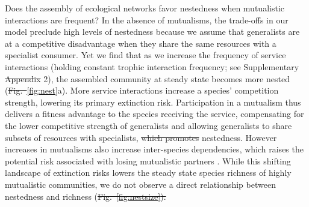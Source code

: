\documentclass[twocolumn,preprintnumbers,amsmath,amssymb,superscriptaddress,linenumbers]{revtex4-1}
\providecommand{\DIFadd}[1]{{\protect\color{blue}\uwave{#1}}} %
\providecommand{\DIFdel}[1]{{\protect\color{red}\sout{#1}}}                      %
\providecommand{\DIFaddbegin}{} %
\providecommand{\DIFaddend}{} %
\providecommand{\DIFdelbegin}{} %
\providecommand{\DIFdelend}{} %
\newcommand{\DIFscaledelfig}{0.5}
\newlength{\DIFdelgraphicswidth} %
\newlength{\DIFdelgraphicsheight} %
\newcommand{\DIFaddincludegraphics}[2][]{{\color{blue}\fbox{\DIFOincludegraphics[#1]{#2}}}} %
\newcommand{\DIFdelincludegraphics}[2][]{%
\sbox{\DIFdelgraphicsbox}{\DIFOincludegraphics[#1]{#2}}%
\settoboxwidth{\DIFdelgraphicswidth}{\DIFdelgraphicsbox} %
\settoboxtotalheight{\DIFdelgraphicsheight}{\DIFdelgraphicsbox} %
\scalebox{\DIFscaledelfig}{%
\parbox[b]{\DIFdelgraphicswidth}{\usebox{\DIFdelgraphicsbox}\\[-\baselineskip] \rule{\DIFdelgraphicswidth}{0em}}\llap{\resizebox{\DIFdelgraphicswidth}{\DIFdelgraphicsheight}{%
\setlength{\unitlength}{\DIFdelgraphicswidth}%
\begin{picture}(1,1)%
\thicklines\linethickness{2pt} %
{\color[rgb]{1,0,0}\put(0,0){\framebox(1,1){}}}%
{\color[rgb]{1,0,0}\put(0,0){\line( 1,1){1}}}%
{\color[rgb]{1,0,0}\put(0,1){\line(1,-1){1}}}%
\end{picture}%
}\hspace*{3pt}}} %
} %
\DeclareRobustCommand{\DIFaddbegin}{\DIFOaddbegin \let\includegraphics\DIFaddincludegraphics} %
\DeclareRobustCommand{\DIFaddend}{\DIFOaddend \let\includegraphics\DIFOincludegraphics} %
\DeclareRobustCommand{\DIFdelbegin}{\DIFOdelbegin \let\includegraphics\DIFdelincludegraphics} %
\DeclareRobustCommand{\DIFdelend}{\DIFOaddend \let\includegraphics\DIFOincludegraphics} %
\begin{document}
\DIFdelend Does the assembly of ecological networks favor nestedness when mutualistic interactions are frequent?
In the absence of mutualisms, the trade-offs in our model preclude high levels of nestedness because we assume that generalists are at a competitive disadvantage when they share the same resources with a specialist consumer.
Yet we find that as we increase the frequency of service interactions (holding constant trophic interaction frequency; see Supplementary \DIFdelbegin \DIFdel{Appendix }\DIFdelend \DIFaddbegin \DIFadd{Note }\DIFaddend 2), the assembled community at steady state becomes more nested (\DIFdelbegin \DIFdel{Fig.\ }\DIFdelend \DIFaddbegin \DIFadd{Figure }\DIFaddend \ref{fig:nest}a).
More service interactions increase a species' competition strength, lowering its primary extinction risk.
Participation in a mutualism thus delivers a fitness advantage to the species receiving the service, compensating for the lower competitive strength of generalists and allowing generalists to share subsets of resources with specialists, \DIFdelbegin \DIFdel{which promotes }\DIFdelend \DIFaddbegin \DIFadd{promoting }\DIFaddend nestedness.
However increases in mutualisms also increase inter-species dependencies, which raises the potential risk associated with losing mutualistic partners \cite{Bond1994,Colwell2012}. %
While this shifting landscape of extinction risks lowers the steady state species richness of highly mutualistic communities, we do not observe a direct relationship between nestedness and richness (\DIFdelbegin \DIFdel{Fig.\ \ref{fig:nestsize}). }%

\end{document}
